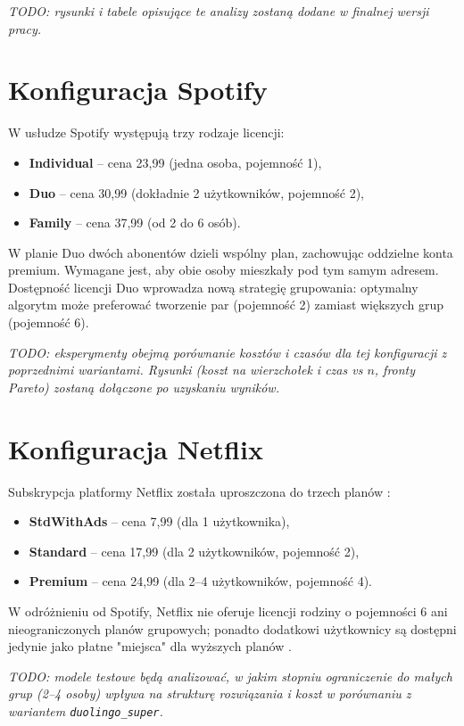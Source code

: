 \emph{TODO: rysunki i tabele opisujące te analizy zostaną dodane w finalnej wersji pracy.}

\section{Konfiguracja Spotify}

W usłudze Spotify występują trzy rodzaje licencji:
\begin{itemize}
  \item \textbf{Individual} -- cena 23,99 (jedna osoba, pojemność 1),
  \item \textbf{Duo} -- cena 30,99 (dokładnie 2 użytkowników, pojemność 2),
  \item \textbf{Family} -- cena 37,99 (od 2 do 6 osób).
\end{itemize}

W planie Duo dwóch abonentów dzieli wspólny plan, zachowując oddzielne konta premium. Wymagane jest, aby obie osoby mieszkały pod tym samym adresem. Dostępność licencji Duo wprowadza nową strategię grupowania: optymalny algorytm może preferować tworzenie par (pojemność 2) zamiast większych grup (pojemność 6).

\emph{TODO: eksperymenty obejmą porównanie kosztów i czasów dla tej konfiguracji z poprzednimi wariantami. Rysunki (koszt na wierzchołek i czas vs $n$, fronty Pareto) zostaną dołączone po uzyskaniu wyników.}

\section{Konfiguracja Netflix}

Subskrypcja platformy Netflix została uproszczona do trzech planów \cite{netflix_plans}:
\begin{itemize}
  \item \textbf{StdWithAds} -- cena 7,99 (dla 1 użytkownika),
  \item \textbf{Standard} -- cena 17,99 (dla 2 użytkowników, pojemność 2),
  \item \textbf{Premium} -- cena 24,99 (dla 2--4 użytkowników, pojemność 4).
\end{itemize}

W odróżnieniu od Spotify, Netflix nie oferuje licencji rodziny o pojemności 6 ani nieograniczonych planów grupowych; ponadto dodatkowi użytkownicy są dostępni jedynie jako płatne "miejsca" dla wyższych planów \cite{netflix_plans}.

\emph{TODO: modele testowe będą analizować, w jakim stopniu ograniczenie do małych grup (2--4 osoby) wpływa na strukturę rozwiązania i koszt w porównaniu z wariantem \texttt{duolingo\_super}.}

